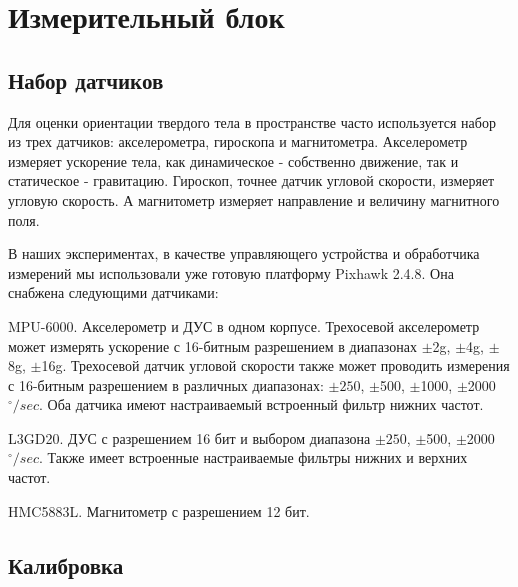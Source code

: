 \documentclass[12pt,a4paper]{article}
\begin{document}



\section{Измерительный блок}
\subsection{Набор датчиков}

Для оценки ориентации твердого тела в пространстве часто используется набор из трех датчиков: акселерометра, гироскопа и магнитометра. Акселерометр измеряет ускорение тела, как динамическое - собственно движение, так и статическое - гравитацию. Гироскоп, точнее датчик угловой скорости, измеряет угловую скорость. А магнитометр измеряет направление и величину магнитного поля.

В наших экспериментах, в качестве управляющего устройства и обработчика измерений мы использовали уже готовую платформу Pixhawk 2.4.8. Она снабжена следующими датчиками:

MPU-6000. Акселерометр и ДУС в одном корпусе. Трехосевой акселерометр может измерять ускорение с 16-битным разрешением в диапазонах $\pm$2g, $\pm$4g, $\pm$8g, $\pm$16g. Трехосевой датчик угловой скорости также может проводить измерения с 16-битным разрешением в различных диапазонах: $\pm250$, $\pm$500, $\pm$1000, $\pm$2000 $^\circ /sec$. Оба датчика имеют настраиваемый встроенный фильтр нижних частот.

L3GD20. ДУС с разрешением 16 бит и выбором диапазона $\pm250$, $\pm$500, $\pm$2000 $^\circ /sec$. Также имеет встроенные настраиваемые фильтры нижних и верхних частот.

HMC5883L. Магнитометр с разрешением 12 бит.

\subsection{Калибровка}
\end{document}
